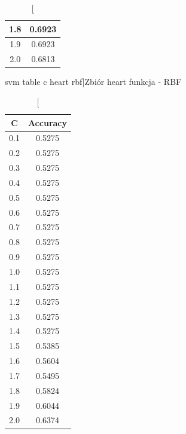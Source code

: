 \documentclass{classrep}
\begin{document}
{{\begin{table}[!htbp]
\begin{minipage}{.3\textwidth}
\begin{tabular}{|c|c|}
                        1.8 & 0.6923 \\ \hline
                        1.9 & 0.6923 \\ \hline
                        2.0 & 0.6813 \\ \hline
                    \end{tabular}
                    \caption
                    [svm table c heart rbf]{Zbiór heart funkcja - RBF}
                    \label{svm_table_c_heart_rbf}
                \end{minipage}
                \hfill
                \begin{minipage}{.3\textwidth}
                    \centering
                    \begin{tabular}{|c|c|}
                        \hline
                        C & Accuracy \\ \hline
                        0.1 & 0.5275 \\ \hline
                        0.2 & 0.5275 \\ \hline
                        0.3 & 0.5275 \\ \hline
                        0.4 & 0.5275 \\ \hline
                        0.5 & 0.5275 \\ \hline
                        0.6 & 0.5275 \\ \hline
                        0.7 & 0.5275 \\ \hline
                        0.8 & 0.5275 \\ \hline
                        0.9 & 0.5275 \\ \hline
                        1.0 & 0.5275 \\ \hline
                        1.1 & 0.5275 \\ \hline
                        1.2 & 0.5275 \\ \hline
                        1.3 & 0.5275 \\ \hline
                        1.4 & 0.5275 \\ \hline
                        1.5 & 0.5385 \\ \hline
                        1.6 & 0.5604 \\ \hline
                        1.7 & 0.5495 \\ \hline
                        1.8 & 0.5824 \\ \hline
                        1.9 & 0.6044 \\ \hline
                        2.0 & 0.6374 \\ \hline

\end{tabular}
\end{minipage}
\end{table}}}
\end{document}
